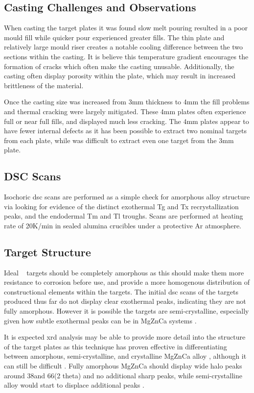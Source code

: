 \documentclass[a4paper,12pt,oneside]{report}%
\begin{document}
\subsection{Casting Challenges and Observations}
When casting the target plates it was found slow melt pouring resulted in a poor mould fill while quicker pour experienced greater fills. The thin plate and relatively large mould riser creates a notable cooling difference between the two sections within the casting. It is believe this temperature gradient encourages the formation of cracks which often make the casting unusable. Additionally, the casting often display porosity within the plate, which may result in increased brittleness of the material. 

Once the casting size was increased from 3mm thickness to 4mm the fill problems and thermal cracking were largely mitigated. These 4mm plates often experience full or near full fills, and displayed much less cracking. The 4mm plates appear to have fewer internal defects as it has been possible to extract two nominal targets from each plate, while was difficult to extract even one target from the 3mm plate. 

\subsection{DSC Scans}
Isochoric \gls{dsc} scans are performed as a simple check for amorphous alloy structure via looking for evidence of the distinct exothermal \gls{Tg} and \gls{Tx} recrystallization peaks, and the endodermal \gls{Tm} and \gls{Tl} troughs. Scans are performed at heating rate of 20K/min in sealed alumina crucibles under a protective Ar atmosphere.

\subsection{Target Structure}
Ideal \MgZnCa~ targets should be completely amorphous as this should make them more resistance to corrosion before use, and provide a more homogenous distribution of constructional elements within the targets. The initial \gls{dsc} scans of the targets produced thus far do not display clear exothermal peaks, indicating they are not fully amorphous. However it is possible the targets are semi-crystalline, especially given how subtle exothermal peaks can be in MgZnCa systems \cite{Gu2010}. 

It is expected \gls{xrd} analysis may be able to provide more detail into the structure of the target plates as this technique has proven effective in differentiating between amorphous, semi-crystalline, and crystalline MgZnCa alloy \cite{Schluter2012, Wang2012}, although it can still be difficult \cite{Zhou2013}. Fully amorphous MgZnCa should display wide halo peaks around 38\degree and 66\degree (2 theta) and no additional sharp peaks, while semi-crystalline alloy would start to displace additional peaks \cite{Cao2013b, Gu2005, Wang2012, Gu2010, Cao2012}. 
\end{document}

